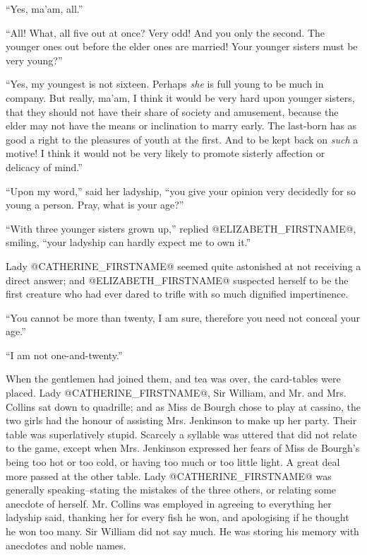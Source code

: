 ``Yes, ma'am, all.''

``All! What, all five out at once? Very odd! And you only the second. The
younger ones out before the elder ones are married! Your younger sisters
must be very young?''

``Yes, my youngest is not sixteen. Perhaps \textit{she} is full young to be
much in company. But really, ma'am, I think it would be very hard upon
younger sisters, that they should not have their share of society and
amusement, because the elder may not have the means or inclination to
marry early. The last-born has as good a right to the pleasures of youth
at the first. And to be kept back on \textit{such} a motive! I think it would
not be very likely to promote sisterly affection or delicacy of mind.''

``Upon my word,'' said her ladyship, ``you give your opinion very decidedly
for so young a person. Pray, what is your age?''

``With three younger sisters grown up,'' replied @ELIZABETH_FIRSTNAME@, smiling, ``your
ladyship can hardly expect me to own it.''

Lady @CATHERINE_FIRSTNAME@ seemed quite astonished at not receiving a direct answer;
and @ELIZABETH_FIRSTNAME@ suspected herself to be the first creature who had ever
dared to trifle with so much dignified impertinence.

``You cannot be more than twenty, I am sure, therefore you need not
conceal your age.''

``I am not one-and-twenty.''

When the gentlemen had joined them, and tea was over, the card-tables
were placed. Lady @CATHERINE_FIRSTNAME@, Sir William, and Mr. and Mrs. Collins sat
down to quadrille; and as Miss de Bourgh chose to play at cassino, the
two girls had the honour of assisting Mrs. Jenkinson to make up her
party. Their table was superlatively stupid. Scarcely a syllable was
uttered that did not relate to the game, except when Mrs. Jenkinson
expressed her fears of Miss de Bourgh's being too hot or too cold, or
having too much or too little light. A great deal more passed at the
other table. Lady @CATHERINE_FIRSTNAME@ was generally speaking--stating the mistakes
of the three others, or relating some anecdote of herself. Mr. Collins
was employed in agreeing to everything her ladyship said, thanking her
for every fish he won, and apologising if he thought he won too many.
Sir William did not say much. He was storing his memory with anecdotes
and noble names.


